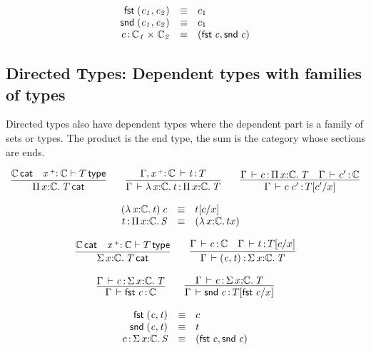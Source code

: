 \documentclass[11pt]{article}
\theoremstyle{plain}
\begin{document}
\[
\begin{array}{rcll}
\mathit{\mathsf{fst}_{} \: \mathit{(c_1,c_2)_{}}} & \equiv & c_1 \\
\mathit{\mathsf{snd}_{} \: \mathit{(c_1,c_2)_{}}} & \equiv & c_1 \\
c \, \mathit{:} \, \mathit{\mathbb{C}_1} \times_{\mathit{}} \mathit{\mathbb{C}_2} & \equiv & \mathit{(\mathit{\mathsf{fst}_{} \: c},\mathit{\mathsf{snd}_{} \: c})_{}}
\end{array}
\]

\subsection{Directed Types: Dependent types with families of types}

Directed types also have dependent types where the dependent part is a
family of sets or types. The product is the end type, the sum is the category whose sections are ends.  

\[
\begin{array}{c}
\infer{\wfdtp{\picl{x}{\C}{T}}}
      {\wfdtp{\C} &
       \wftp{\vptptm{x}{\co}{\C}}{T}}
\qquad
\infer{\ofdtp{\Gamma}{\lam{x}{\C}{t}}{\picl x \C T}}
      {\oftp{\Gamma,\vtptm{x}{\co}{\C}}{t}{T}}
\qquad
\infer{\oftp{\Gamma}{\app c {c'}}{\subst T {c'} x}}
      {\oftp{\Gamma}{c}{\picl{x}{\C}{T}} &
        \oftp{\Gamma}{c'}{\C}}
\end{array}
\]

\[
\begin{array}{rcll}
\mathit{({\lambda\,x \mathit{:} \mathbb{C}.\,t}) \: c} & \equiv & t [ c / x ] \\
t \, \mathit{:} \, \textnormal{$\Pi$}\,x \mathit{:} \mathbb{C}.\,\mathit{S} & \equiv & {({\lambda\,x \mathit{:} \mathbb{C}.\,t}{x})} &
\end{array} \\
\]

\[
\begin{array}{c}
\infer{\wfdtp{\sigmacl{x}{\C}{T}}}
      {\wfdtp{\C} &
        \wftp{\vtptm{x}{\co}{\C}}{T}}
\qquad
\infer{\ofdtp{\Gamma}{\pair{c}{t}}{\sigmacl x \C T}}
      {\ofdtp{\Gamma}{c}{\C} &
       \ofdtp{\Gamma}{t}{\subst{T}{c}{x}}}
\\ \\
\infer{\ofdtp{\Gamma}{\fst c}{\C}}
      {\ofdtp{\Gamma}{c}{\sigmacl{x}{\C}{T}}}
\qquad
\infer{\ofdtp{\Gamma}{\snd c}{\subst{T}{\fst c}{x}}}
      {\ofdtp{\Gamma}{c}{\sigmacl{x}{\C}{T}}}
\end{array}
\]

\[
\begin{array}{rcll}
\mathit{\mathsf{fst}_{} \: \mathit{(c,t)_{}}} & \equiv & c \\
\mathit{\mathsf{snd}_{} \: \mathit{(c,t)_{}}} & \equiv & t \\
c \, \mathit{:} \, \textnormal{$\Sigma$}\,x \mathit{:} \mathbb{C}.\,\mathit{S} & \equiv & \mathit{(\mathit{\mathsf{fst}_{} \: c},\mathit{\mathsf{snd}_{} \: c})_{}}
\end{array}
\]
\end{document}

